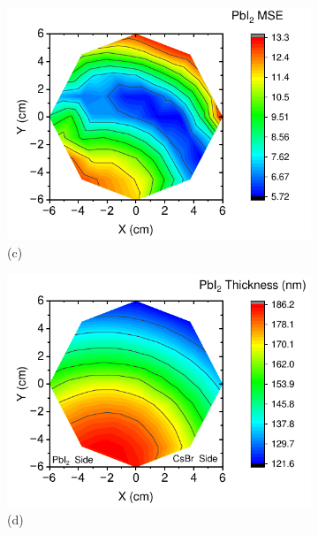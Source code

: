\begin{figure}[htbp]
    \begin{subfigure}[t]{0.49\textwidth}
        \centering
        \includegraphics[width=\textwidth]{chapters/stability/imeges/PbI2MSE.pdf} %
        \caption*{(c)}
    \end{subfigure}
    \hfill
    \begin{subfigure}[t]{0.49\textwidth}
        \centering
        \includegraphics[width=\textwidth]{chapters/stability/imeges/PbI2Thickness.pdf} %
        \caption*{(d)}
    \end{subfigure}
    \caption{}
    \label{}
\end{figure}


